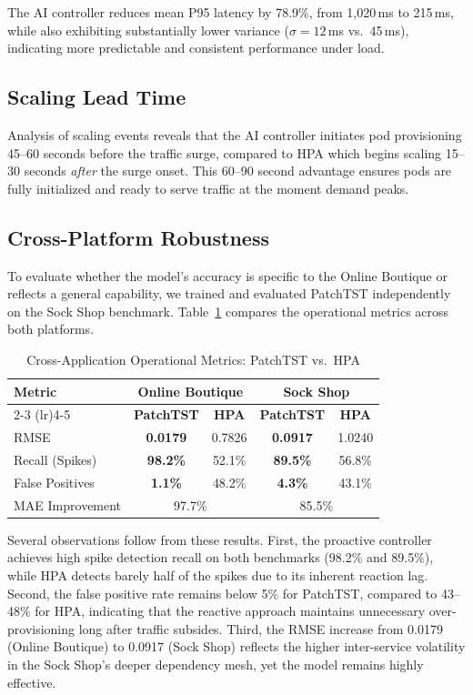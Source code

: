 \documentclass[conference]{IEEEtran}
\begin{document}
The AI controller reduces mean P95 latency by 78.9\%, from 1,020\,ms to 215\,ms, while also exhibiting substantially lower variance ($\sigma = 12$\,ms vs.\ 45\,ms), indicating more predictable and consistent performance under load.

\subsection{Scaling Lead Time}
Analysis of scaling events reveals that the AI controller initiates pod provisioning 45--60 seconds before the traffic surge, compared to HPA which begins scaling 15--30 seconds \textit{after} the surge onset. This 60--90 second advantage ensures pods are fully initialized and ready to serve traffic at the moment demand peaks.

\subsection{Cross-Platform Robustness}
To evaluate whether the model's accuracy is specific to the Online Boutique or reflects a general capability, we trained and evaluated PatchTST independently on the Sock Shop benchmark. Table~\ref{tab:cross_app} compares the operational metrics across both platforms.

\begin{table}[htbp]
\caption{Cross-Application Operational Metrics: PatchTST vs.\ HPA}
\label{tab:cross_app}
\centering
\begin{tabular}{lcccc}
\toprule
\textbf{Metric} & \multicolumn{2}{c}{\textbf{Online Boutique}} & \multicolumn{2}{c}{\textbf{Sock Shop}} \\
\cmidrule(lr){2-3} \cmidrule(lr){4-5}
& \textbf{PatchTST} & \textbf{HPA} & \textbf{PatchTST} & \textbf{HPA} \\
\midrule
RMSE & \textbf{0.0179} & 0.7826 & \textbf{0.0917} & 1.0240 \\
Recall (Spikes) & \textbf{98.2\%} & 52.1\% & \textbf{89.5\%} & 56.8\% \\
False Positives & \textbf{1.1\%} & 48.2\% & \textbf{4.3\%} & 43.1\% \\
MAE Improvement & \multicolumn{2}{c}{97.7\%} & \multicolumn{2}{c}{85.5\%} \\
\bottomrule
\end{tabular}
\end{table}

Several observations follow from these results. First, the proactive controller achieves high spike detection recall on both benchmarks (98.2\% and 89.5\%), while HPA detects barely half of the spikes due to its inherent reaction lag. Second, the false positive rate remains below 5\% for PatchTST, compared to 43--48\% for HPA, indicating that the reactive approach maintains unnecessary over-provisioning long after traffic subsides. Third, the RMSE increase from 0.0179 (Online Boutique) to 0.0917 (Sock Shop) reflects the higher inter-service volatility in the Sock Shop's deeper dependency mesh, yet the model remains highly effective.
\end{document}
